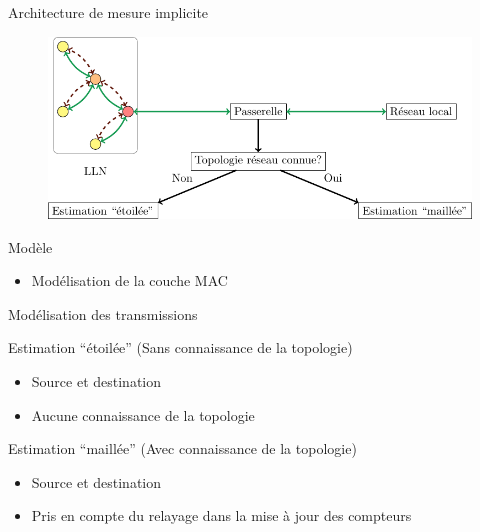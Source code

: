 \begin{frame}{Architecture de mesure implicite}
  \begin{figure}
    \centering
    \includegraphics[width=\textwidth]{figures/schema_supervision_slides.pdf}
  \end{figure}
  \begin{block}{Modèle}
    \begin{itemize}
      \item Modélisation de la couche MAC
    \end{itemize}
  \end{block}
\end{frame}

\begin{frame}{Modélisation des transmissions}
  \begin{figure}
    
  \end{figure}
  \begin{block}{Estimation ``étoilée'' (Sans connaissance de la topologie)}
    \begin{itemize}
      \item Source et destination
      \item Aucune connaissance de la topologie
    \end{itemize}
  \end{block}
  \begin{block}{Estimation ``maillée'' (Avec connaissance de la topologie)}
    \begin{itemize}
      \item Source et destination
      \item Pris en compte du relayage dans la mise à jour des compteurs
    \end{itemize}
  \end{block}
\end{frame}

\DeclarePairedDelimiter{\ceil}{\lceil}{\rceil}

